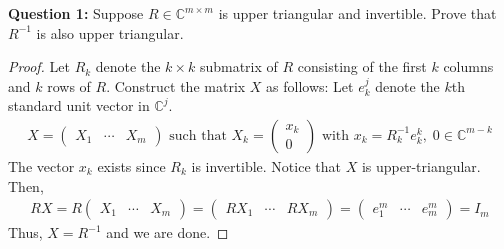 \documentclass{article}
\theoremstyle{plain}
\theoremstyle{definition}
\theoremstyle{remark}
\newcommand{\C}{\mathbb{C}}
\newenvironment{question}[1]{\begin{tcolorbox}\textbf{Question #1: }}{\end{tcolorbox}}
\begin{document}
\begin{question}{1}
	Suppose $ R \in \C^{m \times m} $ is upper triangular and invertible. Prove that $ R^{-1} $ is also upper triangular.
\end{question}

\begin{proof}
	Let $ R_k $ denote the $ k \times k $ submatrix of $ R $ consisting of the first $ k $ columns and $ k $ rows of $ R $. Construct the matrix $ X $ as follows: Let $ e_k^{j} $ denote the $ k $th standard unit vector in $ \C^j $.
	\begin{align}
	  X = \begin{pmatrix} X_1 & \dotsb & X_m \end{pmatrix} \text{ such that } X_k = \begin{pmatrix} x_k \\ 0 \end{pmatrix} \text{ with } x_k = R_k^{-1} e_k^k, \; 0 \in \C^{m - k}
	\end{align}
	The vector $ x_k $ exists since $ R_k $ is invertible. Notice that $ X $ is upper-triangular. Then,
	\begin{align}
	  RX = R \begin{pmatrix} X_1 & \dotsb & X_m \end{pmatrix} = \begin{pmatrix} RX_1 & \dotsb & RX_m \end{pmatrix} = \begin{pmatrix} e_1^m & \dotsb & e_m^m \end{pmatrix} = I_m
	\end{align}
	Thus, $ X = R^{-1} $ and we are done.
\end{proof}
\end{document}
